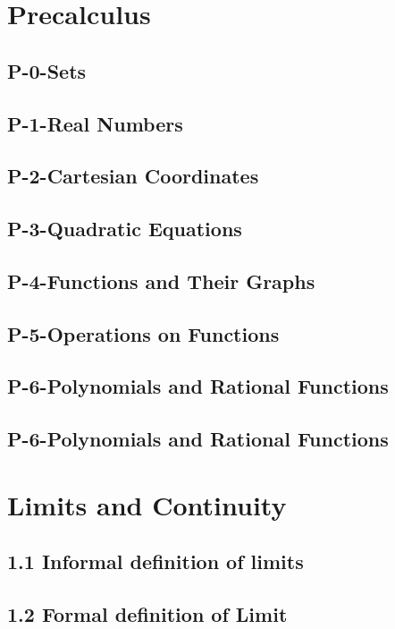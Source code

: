 \documentclass[12pt]{memoir}
\begin{document}
\tableofcontents
\chapter*{Precalculus}
    \section*{P-0-Sets}
    
    \section*{P-1-Real Numbers}
    
    \section*{P-2-Cartesian Coordinates}
    
    \section*{P-3-Quadratic Equations}
    
    \section*{P-4-Functions and Their Graphs}
    
    \section*{P-5-Operations on Functions}
    
    \section*{P-6-Polynomials and Rational Functions}
    
    \section*{P-6-Polynomials and Rational Functions}
    
\chapter*{Limits and Continuity}
    \section*{1.1 Informal definition of limits}
    
    \section*{1.2 Formal definition of Limit}
    
\end{document}
